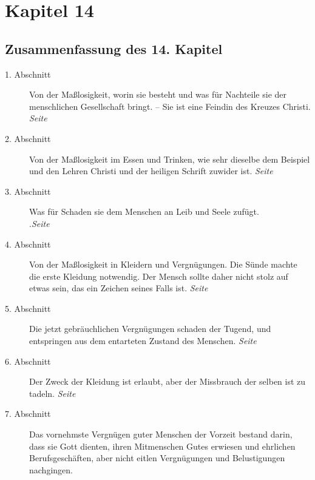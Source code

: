 
\chapter{Kapitel 14} \label{kap14}

\section{Zusammenfassung des 14. Kapitel}

\begin{description}
\item[1. Abschnitt] Von der Maßlosigkeit,
worin sie besteht und was für Nachteile
sie der menschlichen Gesellschaft bringt. -- Sie ist eine Feindin des Kreuzes
Christi.
\dotfill \textit{Seite~\pageref{kap14_ab1}}\\
\item[2. Abschnitt] Von der Maßlosigkeit
im Essen und Trinken, wie sehr dieselbe
dem Beispiel und den Lehren Christi und der heiligen Schrift zuwider ist.
\dotfill \textit{Seite~\pageref{kap14_ab2}}\\
\item[3. Abschnitt] Was für Schaden sie dem Menschen an Leib und Seele zufügt.\\
.\dotfill \textit{Seite~\pageref{kap14_ab3}}\\
\item[4. Abschnitt] Von der Maßlosigkeit in Kleidern und Vergnügungen. Die Sünde
machte die erste Kleidung notwendig. Der Mensch sollte daher nicht stolz auf
etwas sein, das ein Zeichen seines Falls ist.
\dotfill \textit{Seite~\pageref{kap14_ab4}}\\
\item[5. Abschnitt] Die jetzt gebräuchlichen Vergnügungen schaden der Tugend,
und
entspringen aus dem entarteten Zustand des Menschen.
\dotfill \textit{Seite~\pageref{kap14_ab5}}\\
\item[6. Abschnitt] Der Zweck der Kleidung ist erlaubt, aber der Missbrauch
der selben ist zu tadeln.
\dotfill \textit{Seite~\pageref{kap14_ab6}}\\
\item[7. Abschnitt] Das vornehmste Vergnügen guter Menschen der Vorzeit bestand
darin, dass sie Gott dienten, ihren Mitmenschen Gutes erwiesen und ehrlichen
Berufsgeschäften, aber nicht eitlen Vergnügungen und Belustigungen nachgingen.

\end{description}
